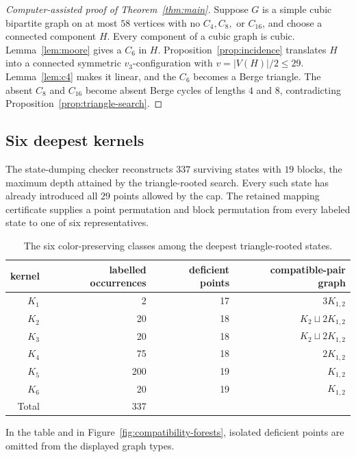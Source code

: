 \documentclass[11pt]{article}
\theoremstyle{definition}
\begin{document}
\begin{proof}[Computer-assisted proof of Theorem~\ref{thm:main}]
Suppose \(G\) is a simple cubic bipartite graph on at most \(58\) vertices
with no \(C_4,C_8,\) or \(C_{16}\), and choose a connected component \(H\).
Every component of a cubic graph is cubic. Lemma~\ref{lem:moore} gives a
\(C_6\) in \(H\). Proposition~\ref{prop:incidence} translates \(H\) into a
connected symmetric \(v_3\)-configuration with
\(v=|V(H)|/2\leq29\). Lemma~\ref{lem:c4} makes it linear, and the \(C_6\)
becomes a Berge triangle. The absent \(C_8\) and \(C_{16}\) become absent
Berge cycles of lengths \(4\) and \(8\), contradicting
Proposition~\ref{prop:triangle-search}.
\end{proof}

\subsection{Six deepest kernels}

The state-dumping checker reconstructs \(337\) surviving states with
\(19\) blocks, the maximum depth attained by the triangle-rooted search.
Every such state has already introduced all \(29\) points allowed by the cap.
The retained mapping certificate supplies a point permutation and
block permutation from every labeled state to one of six representatives.

\begin{table}[ht]
\centering
\small
\caption{The six color-preserving classes among the deepest triangle-rooted states.}
\label{tab:triangle-kernels}
\begin{tabular}{rrrr}
\toprule
kernel & labelled occurrences & deficient points & compatible-pair graph\\
\midrule
$K_1$ & 2 & 17 & $3K_{1,2}$\\
$K_2$ & 20 & 18 & $K_2\sqcup2K_{1,2}$\\
$K_3$ & 20 & 18 & $K_2\sqcup2K_{1,2}$\\
$K_4$ & 75 & 18 & $2K_{1,2}$\\
$K_5$ & 200 & 19 & $K_{1,2}$\\
$K_6$ & 20 & 19 & $K_{1,2}$\\
\midrule
Total & 337 & &\\
\bottomrule
\end{tabular}
\end{table}

In the table and in Figure~\ref{fig:compatibility-forests}, isolated deficient
points are omitted from the displayed graph types.
\end{document}
